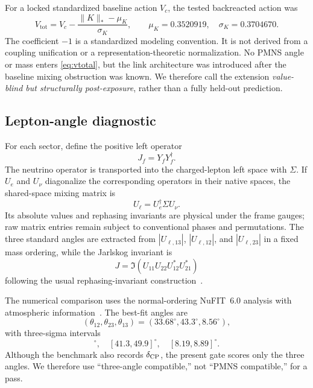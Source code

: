 \documentclass[11pt]{article}
\begin{document}
For a locked standardized baseline action $V_c$, the tested backreacted action was
\begin{equation}
  V_{\mathrm{tot}}
  =V_c-\frac{\|K\|_*-\mu_K}{\sigma_K},
  \qquad
  \mu_K=0.3520919,\quad \sigma_K=0.3704670.
  \label{eq:vtotal}
\end{equation}
The coefficient $-1$ is a standardized modeling convention.  It is not derived from a coupling unification or a representation-theoretic normalization.  No PMNS angle or mass enters \cref{eq:vtotal}, but the link architecture was introduced after the baseline mixing obstruction was known.  We therefore call the extension \emph{value-blind but structurally post-exposure}, rather than a fully held-out prediction.

\subsection{Lepton-angle diagnostic}

For each sector, define the positive left operator
\begin{equation}
  J_f=Y_fY_f^\dagger.
\end{equation}
The neutrino operator is transported into the charged-lepton left space with $\Sigma$.  If $U_e$ and $U_\nu$ diagonalize the corresponding operators in their native spaces, the shared-space mixing matrix is
\begin{equation}
  U_{\ell}=U_e^\dagger\Sigma U_\nu.
  \label{eq:mixing}
\end{equation}
Its absolute values and rephasing invariants are physical under the frame gauges; raw matrix entries remain subject to conventional phases and permutations.  The three standard angles are extracted from $|U_{\ell,13}|$, $|U_{\ell,12}|$, and $|U_{\ell,23}|$ in a fixed mass ordering, while the Jarlskog invariant is
\begin{equation}
  J=\Im(U_{11}U_{22}U_{12}^*U_{21}^*)
  \label{eq:jarlskog}
\end{equation}
following the usual rephasing-invariant construction~\cite{KobayashiMaskawa1973,Jarlskog1985}.

The numerical comparison uses the normal-ordering NuFIT~6.0 analysis with atmospheric information~\cite{Esteban2024}.  The best-fit angles are
\begin{equation}
  (\theta_{12},\theta_{23},\theta_{13})=(33.68^\circ,43.3^\circ,8.56^\circ),
\end{equation}
with three-sigma intervals
\begin{equation}
  [31.63,35.95]^\circ,\quad [41.3,49.9]^\circ,\quad [8.19,8.89]^\circ.
  \label{eq:nufit-ranges}
\end{equation}
Although the benchmark also records $\delta_{\rm CP}$, the present gate scores only the three angles.  We therefore use ``three-angle compatible,'' not ``PMNS compatible,'' for a pass.
\end{document}
